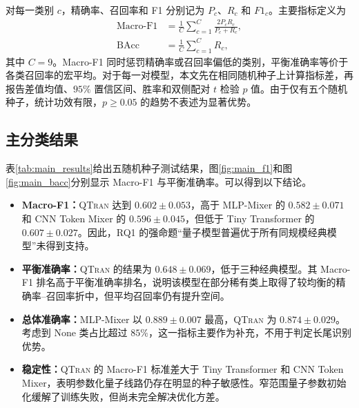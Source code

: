 \documentclass[journal]{IEEEtran}
\newcommand{\qtran}{\textsc{QTran}}
\newcommand{\macroF}{\operatorname{Macro\text{-}F1}}
\newcommand{\bacc}{\operatorname{BAcc}}
\begin{document}
\begin{table}[t]
  \centering
  \caption{主实验设置}
  \label{tab:settings}
\end{table}

对每一类别 $c$，精确率、召回率和 F1 分别记为 $P_c$、$R_c$ 和 $F1_c$。主要指标定义为
\begin{align}
  \macroF&=\frac{1}{C}\sum_{c=1}^{C}
  \frac{2P_cR_c}{P_c+R_c},\\
  \bacc&=\frac{1}{C}\sum_{c=1}^{C}R_c,
\end{align}
其中 $C=9$。Macro-F1 同时惩罚精确率或召回率偏低的类别，平衡准确率等价于各类召回率的宏平均。对于每一对模型，本文先在相同随机种子上计算指标差，再报告差值均值、$95\%$ 置信区间、胜率和双侧配对 $t$ 检验 $p$ 值。由于仅有五个随机种子，统计功效有限，$p\ge0.05$ 的趋势不表述为显著优势。

\subsection{主分类结果}

表\ref{tab:main_results}给出五随机种子测试结果，图\ref{fig:main_f1}和图\ref{fig:main_bacc}分别显示 Macro-F1 与平衡准确率。可以得到以下结论。

\begin{itemize}[leftmargin=1.5em]
  \item \textbf{Macro-F1：}\qtran{} 达到 $0.602\pm0.053$，高于 MLP-Mixer 的 $0.582\pm0.071$ 和 CNN Token Mixer 的 $0.596\pm0.045$，但低于 Tiny Transformer 的 $0.607\pm0.027$。因此，RQ1 的强命题“量子模型普遍优于所有同规模经典模型”未得到支持。
  \item \textbf{平衡准确率：}\qtran{} 的结果为 $0.648\pm0.069$，低于三种经典模型。其 Macro-F1 排名高于平衡准确率排名，说明该模型在部分稀有类上取得了较均衡的精确率--召回率折中，但平均召回率仍有提升空间。
  \item \textbf{总体准确率：}MLP-Mixer 以 $0.889\pm0.007$ 最高，\qtran{} 为 $0.874\pm0.029$。考虑到 None 类占比超过 $85\%$，这一指标主要作为补充，不用于判定长尾识别优势。
  \item \textbf{稳定性：}\qtran{} 的 Macro-F1 标准差大于 Tiny Transformer 和 CNN Token Mixer，表明参数化量子线路仍存在明显的种子敏感性。窄范围量子参数初始化缓解了训练失败，但尚未完全解决优化方差。
\end{itemize}
\end{document}
